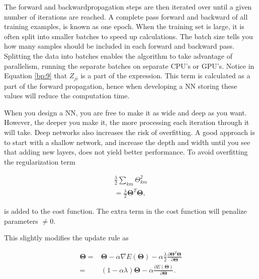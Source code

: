             
            
            
            The forward and backwardpropagation steps are then iterated over until a given number of iterations are reached. A complete pass forward and backward of all training examples, is known as one epoch. When the training set is large, it is often split into smaller batches to speed up calculations. The batch size tells you how many samples should be included in each forward and backward pass. Splitting the data into batches enables the algorithm to take advantage of parallelism, running the separate batches on separate CPU's or GPU's. Notice in Equation \ref{bp:9} that $Z_{ji}$ is a part of the expression. This term is calculated as a part of the forward propagation, hence when developing a NN storing these values will reduce the computation time. 
    
                
            When you design a NN, you are free to make it as wide and deep as you want. However, the deeper you make it, the more processing each iteration through it will take. Deep networks also increases the risk of overfitting. A good approach is to start with a shallow network, and increase the depth and width until you see that adding new layers, does not yield better performance. To avoid overfitting the regularization term 
            
            \begin{align}
                \frac{\lambda}{2} \sum_{km} \Theta_{km}^2  \nonumber \\
                = \frac{\lambda}{2}\bm \Theta^T \bm \Theta,
                \label{nn:overfit}
            \end{align} 
            
            is added to the cost function. The extra term in the cost function will penalize parameters $\neq 0$.   
            
            
            This slightly modifies the update rule as 
            
            \begin{align}
                \bm \Theta = & \bm \Theta - \alpha \nabla E(\bm \Theta) - \alpha \frac{\lambda}{2} \frac{\partial \bm \Theta^T \bm \Theta}{\partial \bm \Theta} \nonumber \\
                = &(1-\alpha \lambda)\bm \Theta - \alpha \frac{\partial E(\bm \Theta)}{\partial \bm \Theta}.
                \label{nn:updaterule2}
            \end{align}
            
